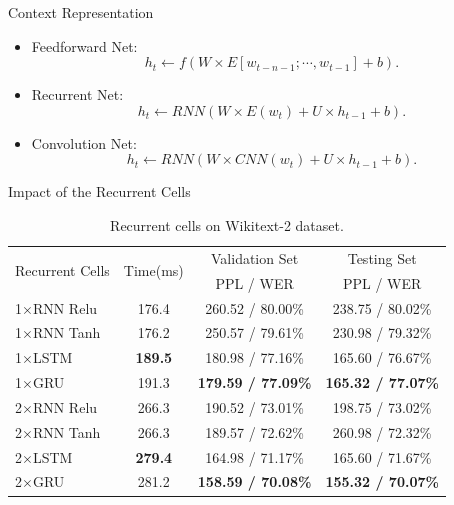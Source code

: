 \documentclass[english]{beamer} %
\begin{document}
\begin{frame}[<+->]{Context Representation}

\begin{itemize}
  \item Feedforward Net: \begin{equation}h_t \leftarrow f(W\times E{[w_{t-n-1};\cdots,w_{t-1}]}  +b).\end{equation}
  \item Recurrent Net:\begin{equation}h_t \leftarrow RNN(W\times E(w_t) + U\times h_{t-1} +b).\end{equation}
  \item Convolution Net: \begin{equation}h_t \leftarrow RNN(W \times CNN(w_t) + U\times h_{t-1} +b).\end{equation}
\end{itemize}

\end{frame}


\begin{frame}[<+->]{Impact of the Recurrent Cells}
\begin{table}[!b]
\setlength{\abovecaptionskip}{0pt}
\setlength{\abovedisplayskip}{0pt}
\small
  \centering
  \caption{Recurrent cells on Wikitext-2 dataset.\label{tab:rnn}}
\begin{tabular}{lccc}
  \toprule
  \multirow{2}{*}{Recurrent Cells} & \multirow{2}{*}{Time(ms)}&Validation Set & Testing Set\\
  && PPL / WER & PPL / WER\\ \midrule
  1$\times$RNN Relu~\cite{DBLP:journals/jmlr/GutmannH10} &176.4&260.52 / 80.00\%&238.75 / 80.02\%\\
  1$\times$RNN Tanh~\cite{DBLP:journals/iclr/JiVSAD15}   &176.2&250.57 / 79.61\%&230.98 / 79.32\%\\
  1$\times$LSTM~\cite{7508408}                  &\textbf{189.5}&180.98 / 77.16\%&165.60 / 76.67\%\\
  1$\times$GRU~\cite{DBLP:journals/corr/ChungGCB14}      &191.3&\textbf{179.59 / 77.09\%}&\textbf{165.32 / 77.07\%}\\ \midrule
  2$\times$RNN Relu~\cite{DBLP:journals/jmlr/GutmannH10} &266.3&190.52 / 73.01\%&198.75 / 73.02\%\\
  2$\times$RNN Tanh~\cite{DBLP:journals/iclr/JiVSAD15}   &266.3&189.57 / 72.62\%&260.98 / 72.32\%\\
  2$\times$LSTM~\cite{7508408}                  &\textbf{279.4}&164.98 / 71.17\%&165.60 / 71.67\%\\
  2$\times$GRU~\cite{DBLP:journals/corr/ChungGCB14}      &281.2&\textbf{158.59 / 70.08\%}&\textbf{155.32 / 70.07\%}\\
  \bottomrule
\end{tabular}
\end{table}
\end{frame}
\end{document}
